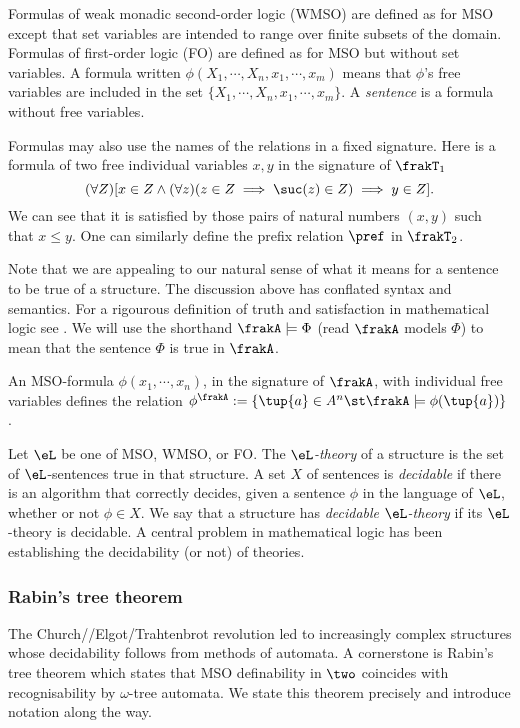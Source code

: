Formulas of weak monadic second-order logic (WMSO) are defined as for MSO
except that set variables are intended to range over finite subsets of the
domain. Formulas of first-order logic (FO) are defined as for MSO but without 
set variables. A formula written $\phi(X_1,\cdots,X_n,x_1,\cdots,x_m)$ means that $\phi$'s
free variables are included in the set $\{X_1,\cdots,X_n,x_1,\cdots,x_m\}$.
A {\em sentence} is a formula without free variables.

Formulas may also use the names of the relations in a fixed signature. 
Here is a formula of two free individual variables $x,y$ in the signature of $\frakT_1$
\[
(\forall Z) [x \in Z \wedge (\forall z)(z \in Z \implies \suc(z) \in Z) \implies y \in Z].
\]
We can see that it is satisfied by those pairs of natural numbers $(x,y)$ such that $x \leq y$. 
One can similarly define the prefix relation $\pref$ in $\frakT_2$.

Note that we are appealing to our natural sense of what it means for a
sentence to be true of a structure. The discussion above has conflated syntax
and semantics. For a rigourous definition of truth and satisfaction in
mathematical logic see \cite{}. We will use the shorthand $\frakA \models \Phi$
(read $\frakA$ models $\Phi$) to mean that the sentence $\Phi$ is true in
$\frakA$.

An MSO-formula $\phi(x_1,\cdots,x_n)$, in the signature of $\frakA$, with
individual free variables defines the relation $\phi^\frakA := \{\tup{a} \in A^n\st
\frakA \models \phi(\tup{a})\}$. 


Let $\eL$ be one of MSO, WMSO, or FO. The {\em $\eL$-theory} of a structure is the set
of $\eL$-sentences true in that structure.  A set $X$ of sentences is {\em
decidable} if there is an algorithm that correctly decides, given a sentence
$\phi$ in the language of $\eL$, whether or not $\phi \in X$.  We say that a
structure has {\em decidable $\eL$-theory} if its $\eL$-theory is decidable.  A
central problem in mathematical logic has been establishing the decidability
(or not) of theories.

\subsubsection{Rabin's tree theorem}

The Church/\buchi/Elgot/Trahtenbrot revolution led to increasingly complex
structures whose decidability follows from methods of automata. A cornerstone
is Rabin's tree theorem which states that MSO definability in $\two$ coincides
with recognisability by $\omega$-tree automata. We state this theorem precisely
and introduce notation along the way.

